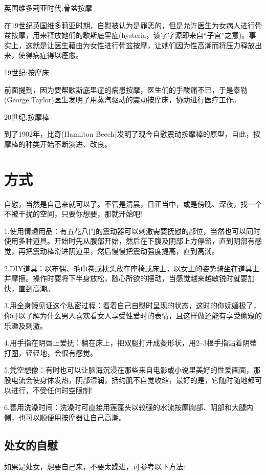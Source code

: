 \documentclass[12pt,UTF8]{ctexbook}
\begin{document}
英国维多莉亚时代:骨盆按摩

在19世纪英国维多莉亚时期，自慰被认为是罪恶的，但是允许医生为女病人进行骨盆按摩，用来释放她们的歇斯底里症(hysteria，该字字源即来自“子宫”之意)。事实上，这就是让医生藉由为女性进行骨盆按摩，让她们因为性高潮而将压力释放出来，使得病症得以痊愈。

19世纪:按摩床

前面提到，因为要帮歇斯底里症的病患按摩，医生们的手酸痛不已，于是泰勒(George Taylor)医生发明了用蒸汽驱动的震动按摩床，协助进行医疗工作。

20世纪:按摩棒

到了1902年，比奇(Hamilton Beech)发明了现今自慰震动按摩棒的原型，自此，按摩棒的种类开始不断演进、改良。

\section{方式}

自慰，当然是自己来就可以了。不管是清晨，日正当中，或是傍晚、深夜，找一个不被干扰的空间，只要你想要，那就开始吧!

1.使用情趣用品：有五花八门的震动器可以刺激需要抚慰的部位，当然也可以同时使用多种道具。开始时先从腹部开始，然后在下腹及阴部上方停留，直到阴部有感觉，再把震动棒滑进阴道里，然后慢慢把震动强度提高，直到高潮。

2.DIY道具：以布偶、毛巾卷或枕头放在座椅或床上，以女上的姿势骑坐在道具上并摩擦。操作时要将下半身放松，随心所欲的摆动，当感觉越来越敏锐时就要加快，直到高潮。

3.用全身镜见证这个私密过程：看着自己自慰时呈现的状态，这时的你妩媚极了，你可以了解为什么男人喜欢看女人享受性爱时的表情，且这样做还能有享受偷窥的乐趣及刺激。

4.用手指在阴唇上爱抚：躺在床上，把双腿打开成菱形状，用2--3根手指贴着阴蒂打圈，轻轻地，会很有感觉。

5.凭空想像：有时也可以让脑海沉浸在那些来自电影或小说里美好的性爱画面，那股电流会使身体发热，阴部湿润，括约肌不自觉收缩，最好的是，它随时随地都可以进行，不受任何时空限制!

6.善用洗澡时间：洗澡时可直接用莲蓬头以较强的水流按摩胸部、阴部和大腿内侧，也可以顺便用按摩器让自己高潮。

\subsection{处女的自慰}

如果是处女，想要自己来，不要太躁进，可参考以下方法:
\end{document}

